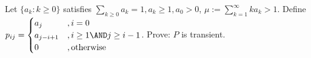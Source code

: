 \documentclass{ctexart}
\begin{document}
\begin{problem}\label{pro:8}
  Let \(\{a_k:k \geq 0\}\) satisfies \(\sum_{k \geq 0}a_k =1, a_k \geq 1, a_0 >0\), \(\mu :=\sum_{k=1}^{\infty} ka_k >1\).
  Define \(p_{ij}=
  \begin{cases}
    a_j         & , i =0                    \\
    a_{j-i + 1} & ,i \geq 1 \AND j \geq i-1 \\
    0           & ,\text{otherwise}
  \end{cases}
  \).
  Prove: \(P\) is transient.
\end{problem}
\end{document}

